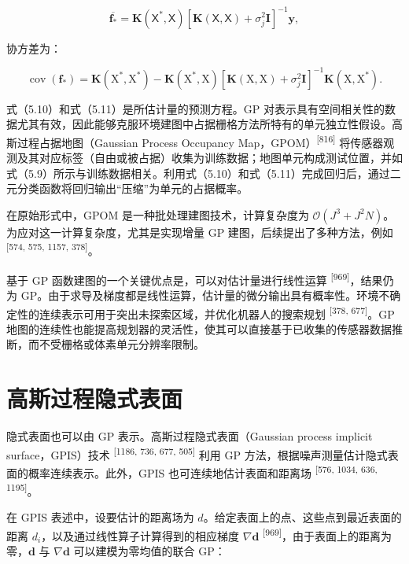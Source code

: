 \begin{equation}
\overline {{\boldsymbol {f} _ {*}}} = \boldsymbol {K} (\mathsf {X} ^ {*}, \mathsf {X}) [ \boldsymbol {K} (\mathsf {X}, \mathsf {X}) + \sigma_ {j} ^ {2} \mathbf {I} ] ^ {- 1} \boldsymbol {y},\tag{5.10}
\end{equation}

协方差为：

\begin{equation}
\operatorname{cov} \left(\boldsymbol {f} _ {*}\right) = \boldsymbol {K} \left(\mathrm{X} ^ {*}, \mathrm{X} ^ {*}\right) - \boldsymbol {K} \left(\mathrm{X} ^ {*}, \mathrm{X}\right) \left[ \boldsymbol {K} (\mathrm{X}, \mathrm{X}) + \sigma_ {j} ^ {2} \mathbf {I} \right] ^ {- 1} \boldsymbol {K} \left(\mathrm{X}, \mathrm{X} ^ {*}\right).\tag{5.11}
\end{equation}

式（5.10）和式（5.11）是所估计量的预测方程。GP 对表示具有空间相关性的数据尤其有效，因此能够克服环境建图中占据栅格方法所特有的单元独立性假设。高斯过程占据地图（Gaussian Process Occupancy Map，GPOM）\textsuperscript{[816]} 将传感器观测及其对应标签（自由或被占据）收集为训练数据；地图单元构成测试位置，并如式（5.9）所示与训练数据相关。利用式（5.10）和式（5.11）完成回归后，通过二元分类函数将回归输出“压缩”为单元的占据概率。

在原始形式中，GPOM 是一种批处理建图技术，计算复杂度为 $\mathcal {O}(J^3+J^2N)$。为应对这一计算复杂度，尤其是实现增量 GP 建图，后续提出了多种方法，例如 \textsuperscript{[574, 575, 1157, 378]}。

基于 GP 函数建图的一个关键优点是，可以对估计量进行线性运算 \textsuperscript{[969]}，结果仍为 GP。由于求导及梯度都是线性运算，估计量的微分输出具有概率性。环境不确定性的连续表示可用于突出未探索区域，并优化机器人的搜索规划 \textsuperscript{[378, 677]}。GP 地图的连续性也能提高规划器的灵活性，使其可以直接基于已收集的传感器数据推断，而不受栅格或体素单元分辨率限制。

\section{高斯过程隐式表面}

隐式表面也可以由 GP 表示。高斯过程隐式表面（Gaussian process implicit surface，GPIS）技术 \textsuperscript{[1186, 736, 677, 505]} 利用 GP 方法，根据噪声测量估计隐式表面的概率连续表示。此外，GPIS 也可连续地估计表面和距离场 \textsuperscript{[576, 1034, 636, 1195]}。

在 GPIS 表述中，设要估计的距离场为 $d$。给定表面上的点、这些点到最近表面的距离 $d_i$，以及通过线性算子计算得到的相应梯度 $\nabla \pmb {d}$ \textsuperscript{[969]}，由于表面上的距离为零，$\pmb {d}$ 与 $\nabla\pmb {d}$ 可以建模为零均值的联合 GP：

